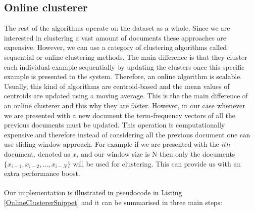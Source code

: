 \subsection{Online clusterer}
The rest of the algorithms operate on the dataset as a whole. Since we are interested in clustering a vast amount of documents these approaches are expensive. However, we can use a category of clustering algorithms called sequential or online clustering methods. The main difference is that they cluster each individual example sequentially by updating the clusters once this specific example is presented to the system. Therefore, an online algorithm is scalable. Usually, this kind of algorithms are centroid-based and the mean values of centroids are updated using a moving average. This is the the main difference of an online clusterer and this why they are faster. However, in our case whenever we are presented with a new document the term-frequency vectors of all the previous documents must be updated. This operation is computationally expensive and therefore instead of considering all the previous document one can use sliding window approach. For example if we are presented with the $ith$ document, denoted as $x_i$ and our window size is N then only the documents $\{ x_{i-1}, x_{i-2},..., x_{i-N}\}$ will be used for clustering. This can provide us with an extra performance boost. \\\\
Our implementation is illustrated in pseudocode in Listing \ref{OnlineClustererSnippet} and it can be summarised in three main steps:

